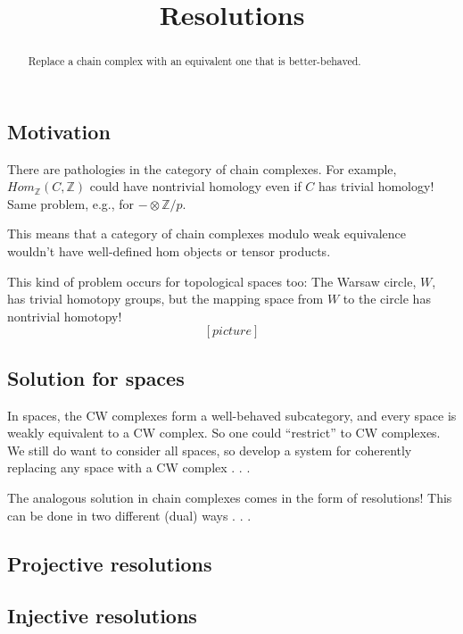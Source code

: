 \documentclass{ximera}
\title{Resolutions}
\begin{document}
\begin{abstract}
  Replace a chain complex with an equivalent one that is better-behaved.
\end{abstract}
\maketitle

\subsection{Motivation}

There are pathologies in the category of chain complexes.  For
example, $Hom_{\mathbb{Z}}(C, \mathbb{Z})$ could have nontrivial
homology even if $C$ has trivial homology!  Same problem, e.g., for $-
\otimes \mathbb{Z}/p$.

This means that a category of chain complexes modulo weak equivalence
wouldn't have well-defined hom objects or tensor products.

This kind of problem occurs for topological spaces too:  The Warsaw
circle, $W$, has trivial homotopy groups, but the mapping space from
$W$ to the circle has nontrivial homotopy!
\[
[picture]
\]

\subsection{Solution for spaces}

In spaces, the CW complexes form a well-behaved subcategory, and every
space is weakly equivalent to a CW complex.  So one could ``restrict''
to CW complexes.  We still do want to consider all spaces, so develop
a system for coherently replacing any space with a CW complex . . .

The analogous solution in chain complexes comes in the form of
resolutions!  This can be done in two different (dual) ways . . .

\subsection{Projective resolutions}



\subsection{Injective resolutions}
\end{document}
